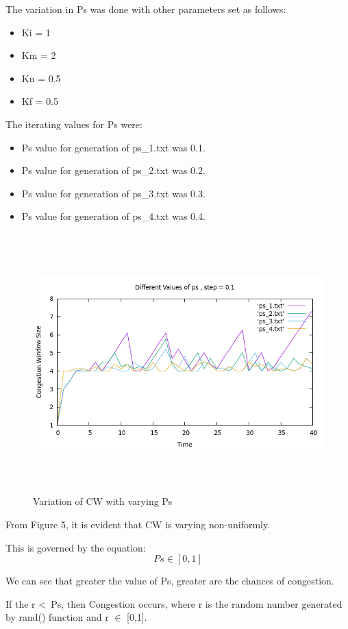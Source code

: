\documentclass[12pt]{article}
\begin{document}
The variation in Ps was done with other parameters set as follows:
\begin{itemize}
    \item Ki = 1
    \item Km = 2
    \item Kn = 0.5
    \item Kf = 0.5
\end{itemize}

The iterating values for Ps were:
\begin{itemize}
    \item Ps value for generation of ps\_1.txt was 0.1.
    \item Ps value for generation of ps\_2.txt was 0.2.
    \item Ps value for generation of ps\_3.txt was 0.3.
    \item Ps value for generation of ps\_4.txt was 0.4.
\end{itemize}

\begin{figure}
    \centering
    \includegraphics[width=15cm, height=10cm]{ps.png}
    \caption{Variation of CW with varying Ps}
\end{figure}

From Figure 5, it is evident that CW is varying non-uniformly.

This is governed by the equation:
\begin{equation*}
    Ps \in [0,1]
\end{equation*}

We can see that greater the value of Ps, greater are the chances of congestion.

If the r \textless \, Ps, then Congestion occurs, where r is the random number generated by rand() function and r $\in$ [0,1].
\end{document}
